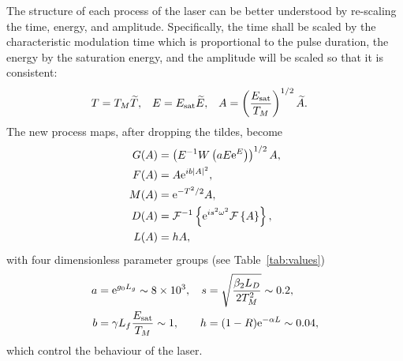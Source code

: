 %
%
%

The structure of each process of the laser can be better understood by re-scaling the time, energy, and amplitude. Specifically, the time shall be scaled by the characteristic modulation time which is proportional to the pulse duration, the energy by the saturation energy, and the amplitude will be scaled so that it is consistent:
\begin{align*}
	T &= T_M \widetilde{T},& E &= E_{\textrm{sat}} \widetilde{E},& A &= \left( \frac{E_{\textrm{sat}}}{T_M} \right)^{1/2} \widetilde{A}.
\end{align*}
The new process maps, after dropping the tildes, become
\begin{subequations}
\begin{align}
G(A) &= \left(E^{-1} W \left( a E \textrm{e}^{E}\right) \right)^{1/2} A, \\
F(A) &= A \textrm{e}^{i b |A|^2}, \\
M(A) &= \textrm{e}^{-T^2 / 2} A, \\
D(A) &= \mathcal{F}^{-1}\left\{ \textrm{e}^{i s^2 \omega^2} \mathcal{F}\left\{ A \right\} \right\}, \\
L(A) &= h A,
\end{align}
\end{subequations}
with four dimensionless parameter groups (see Table~\ref{tab:values})
\begin{align*}
	a &= \textrm{e}^{g_0 L_g} \sim 8 \times 10^3,& s &= \sqrt{\frac{\beta_2 L_D}{2 T_M^2}} \sim 0.2, \\
	b &= \gamma L_f \frac{E_{\textrm{sat}}}{T_M} \sim 1,& h &= (1 - R) \textrm{e}^{-\alpha L} \sim 0.04,
\end{align*}
which control the behaviour of the laser.

